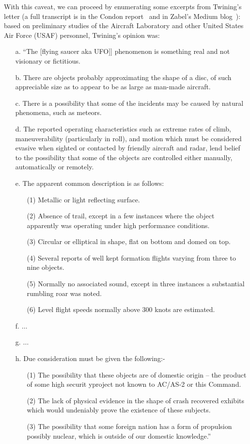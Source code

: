 With this caveat, we can proceed by enumerating some excerpts from Twining's letter
(a full transcript is in the Condon report~\cite[AppendixR]{Condon-report} and in Zabel's Medium blog~\cite{Zabel2022Mar}): based on preliminary studies of the Aircraft Laboratory and other United States Air Force (USAF) personnel, Twining's opinion was:
\begin{svgraybox}
\begin{enumerate}
\item[a.] ``The [flying saucer aka UFO]] phenomenon is something real and not visionary or fictitious.
\item[b.] There are objects probably approximating the shape of a disc, of such appreciable size as to appear to be as large as man-made aircraft.
\item[c.] There is a possibility that some of the incidents may be caused by natural phenomena, such as meteors.
\item[d.] The reported operating characteristics such as extreme rates of climb, maneuverability (particularly in roll), and motion which must be considered evasive when sighted or contacted by friendly aircraft and radar, lend belief to the possibility that some of the objects are controlled either manually, automatically or remotely.
\item[e.] The apparent common description is as follows:
\begin{enumerate}
\item[(1)] Metallic or light reflecting surface.
\item[(2)] Absence of trail, except in a few instances where the object apparently was operating under high performance conditions.
\item[(3)] Circular or elliptical in shape, flat on bottom and domed on top.
\item[(4)] Several reports of well kept formation flights varying from three to nine objects.
\item[(5)] Normally no associated sound, except in three instances a substantial rumbling roar was noted.
\item[(6)] Level flight speeds normally above 300 knots are estimated.
\end{enumerate}
\item[f.] $\ldots$
\item[g.] $\ldots$
\item[h. ] Due consideration must be given the following:-
\begin{enumerate}
\item[(1)] The possibility that these objects are of domestic origin -- the product of some high securit yproject not known to AC/AS-2 or this Command.
\item[(2)] The lack of physical evidence in the shape of crash recovered exhibits which would undeniably prove the existence of these subjects.
\item[(3)] The possibility that some foreign nation has a form of propulsion possibly nuclear, which is outside of our domestic knowledge.''
\end{enumerate}
\end{enumerate}
\end{svgraybox}

